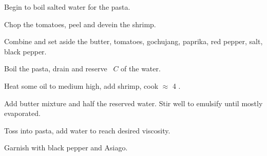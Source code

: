 \begin{preparation}
\item Begin to boil salted water for the pasta.
\item Chop the tomatoes, peel and devein the shrimp.
\item Combine and set aside the butter, tomatoes, gochujang, paprika, red pepper, salt, black pepper.
\item Boil the pasta, drain and reserve \onehalf~$C$ of the water.
\item Heat some oil to medium high, add shrimp, cook $\approx$ 4 \minute.
\item Add butter mixture and half the reserved water.
	Stir well to emulsify until mostly evaporated.
\item Toss into pasta, add water to reach desired viscosity.
\item Garnish with black pepper and Asiago.
\end{preparation}


\recipeend%
